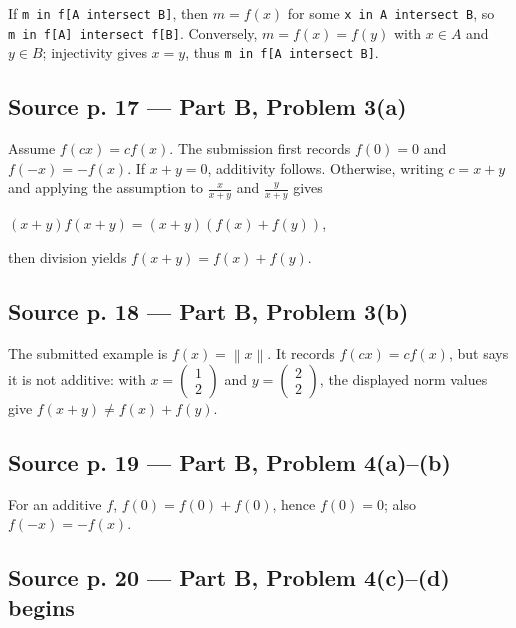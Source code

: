 If \texttt{m\ in\ f{[}A\ intersect\ B{]}}, then \(m = f(x)\) for some \texttt{x\ in\ A\ intersect\ B}, so \texttt{m\ in\ f{[}A{]}\ intersect\ f{[}B{]}}. Conversely, \(m = f(x) = f(y)\) with \(x \in A\) and \(y \in B\); injectivity gives \(x = y\), thus \texttt{m\ in\ f{[}A\ intersect\ B{]}}.

\subsection{Source p. 17 --- Part B, Problem 3(a)}

Assume \(f\left( {cx} \right) = cf(x)\). The submission first records \(f(0) = 0\) and \(f\left( {- x} \right) = - f(x)\). If \(x + y = 0\), additivity follows. Otherwise, writing \(c = x + y\) and applying the assumption to \(\frac{x}{x + y}\) and \(\frac{y}{x + y}\) gives

\(\left( {x + y} \right)f\left( {x + y} \right) = \left( {x + y} \right)\left( {f(x) + f(y)} \right)\),

then division yields \(f\left( {x + y} \right) = f(x) + f(y)\).

\subsection{Source p. 18 --- Part B, Problem 3(b)}

The submitted example is \(f(x) = \left\| x \right\|\). It records \(f\left( {cx} \right) = cf(x)\), but says it is not additive: with \(x = \begin{pmatrix}
1 \\
2
\end{pmatrix}\) and \(y = \begin{pmatrix}
2 \\
2
\end{pmatrix}\), the displayed norm values give \(f\left( {x + y} \right) \neq f(x) + f(y)\).

\subsection{Source p. 19 --- Part B, Problem 4(a)--(b)}

For an additive \(f\), \(f(0) = f(0) + f(0)\), hence \(f(0) = 0\); also \(f\left( {- x} \right) = - f(x)\).

\subsection{Source p. 20 --- Part B, Problem 4(c)--(d) begins}

